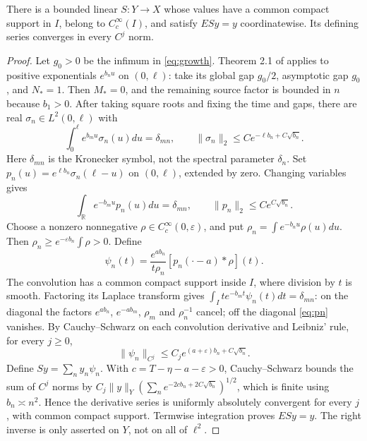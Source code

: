 \begin{proposition}\label{prop:rightinverse}
There is a bounded linear \(S:Y\to X\) whose values have a common compact support in \(I\), belong to \(C_c^\infty(I)\), and satisfy \(ESy=y\) coordinatewise. Its defining series converges in every \(C^j\) norm.
\end{proposition}
\begin{proof}
Let \(g_0>0\) be the infimum in \eqref{eq:growth}. Theorem 2.1 of \cite{Cannarsa2020} applies to positive exponentials \(e^{b_nu}\) on \((0,\ell)\): take its global gap \(g_0/2\), asymptotic gap \(g_0\), and \(N_*=1\). Then \(M_*=0\), and the remaining source factor is bounded in \(n\) because \(b_1>0\). After taking square roots and fixing the time and gaps, there are real \(\sigma_n\in L^2(0,\ell)\) with
\begin{equation}\label{eq:sigma}
\int_0^\ell e^{b_mu}\sigma_n(u)du=\delta_{mn},\qquad
\|\sigma_n\|_2\le C e^{-\ell b_n+C\sqrt{b_n}}.
\end{equation}
Here \(\delta_{mn}\) is the Kronecker symbol, not the spectral parameter \(\delta_n\). Set \(p_n(u)=e^{\ell b_n}\sigma_n(\ell-u)\) on \((0,\ell)\), extended by zero. Changing variables gives
\begin{equation}\label{eq:pn}
\int_{\mathbb R}e^{-b_mu}p_n(u)du=\delta_{mn},\qquad \|p_n\|_2\le C e^{C\sqrt{b_n}}.
\end{equation}
Choose a nonzero nonnegative \(\rho\in C_c^\infty(0,\varepsilon)\), and put \(\rho_n=\int e^{-b_nu}\rho(u)du\). Then \(\rho_n\ge e^{-\varepsilon b_n}\int\rho>0\). Define
\begin{equation}\label{eq:psi}
\psi_n(t)=\frac{e^{ab_n}}{t\rho_n}[p_n(\cdot-a)*\rho](t).
\end{equation}
The convolution has a common compact support inside \(I\), where division by \(t\) is smooth. Factoring its Laplace transform gives \(\int_I te^{-b_mt}\psi_n(t)dt=\delta_{mn}\): on the diagonal the factors \(e^{ab_n}\), \(e^{-ab_m}\), \(\rho_m\) and \(\rho_n^{-1}\) cancel; off the diagonal \eqref{eq:pn} vanishes. By Cauchy--Schwarz on each convolution derivative and Leibniz' rule, for every \(j\ge0\),
\begin{equation}\label{eq:psibound}
\|\psi_n\|_{C^j}\le C_j e^{(a+\varepsilon)b_n+C\sqrt{b_n}}.
\end{equation}
Define \(Sy=\sum_n y_n\psi_n\). With \(c=T-\eta-a-\varepsilon>0\), Cauchy--Schwarz bounds the sum of \(C^j\) norms by \(C_j\|y\|_Y(\sum_n e^{-2cb_n+2C\sqrt{b_n}})^{1/2}\), which is finite using \(b_n\asymp n^2\). Hence the derivative series is uniformly absolutely convergent for every \(j\), with common compact support. Termwise integration proves \(ESy=y\). The right inverse is only asserted on \(Y\), not on all of \(\ell^2\).
\end{proof}
